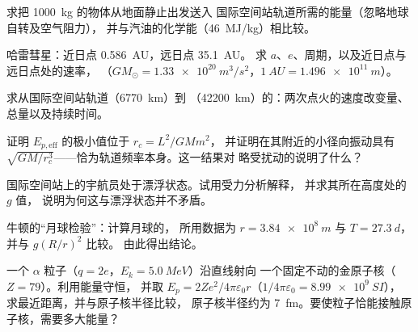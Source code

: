 \begin{exercise}[$\star\star$]\label{exo:b1:central-forces:5}
求把 \qty{1000}{kg} 的物体从地面静止出发送入
国际空间站轨道所需的能量（忽略地球自转及空气阻力），
并与汽油的化学能（\qty{46}{MJ/kg}）相比较。
\end{exercise}

\begin{exercise}[$\star\star$]\label{exo:b1:central-forces:6}
哈雷彗星：近日点 \qty{0.586}{AU}，远日点 \qty{35.1}{AU}。
求 $a$、$e$、周期，以及近日点与远日点处的速率，
（$GM_\odot = \qty{1.33e20}{m^3/s^2}$，$\qty{1}{AU} = \qty{1.496e11}{m}$）。
\end{exercise}

\begin{exercise}[$\star\star$]\label{exo:b1:central-forces:7}
求从国际空间站轨道（\qty{6770}{km}）到
（\qty{42200}{km}）的：两次点火的速度改变量、总量以及持续时间。
\end{exercise}

\begin{exercise}[$\star\star$]\label{exo:b1:central-forces:8}
证明 $E_{p,\mathrm{eff}}$ 的极小值位于 $r_c = L^2/GMm^2$，
并证明在其附近的小径向振动具有
$\sqrt{GM/r_c^3}$——恰为轨道频率本身。这一结果对
略受扰动的说明了什么？
\end{exercise}

\begin{exercise}[$\star\star$]\label{exo:b1:central-forces:9}
国际空间站上的宇航员处于漂浮状态。试用受力分析解释，
并求其所在高度处的 $g$ 值，
说明为何这与漂浮状态并不矛盾。
\end{exercise}

\begin{exercise}[$\star\star\star$]\label{exo:b1:central-forces:10}
牛顿的“月球检验”：计算月球的，
所用数据为 $r = \qty{3.84e8}{m}$ 与 $T = \qty{27.3}{d}$，并与 $g(R/r)^2$ 比较。
由此得出结论。
\end{exercise}

\begin{exercise}[$\star\star\star$]\label{exo:b1:central-forces:11}
一个 $\alpha$ 粒子（$q = 2e$，$E_k = \qty{5.0}{MeV}$）沿直线射向
一个固定不动的金原子核（$Z = 79$）。利用能量守恒，
并取 $E_p = 2Ze^2/4\pi\varepsilon_0r$（$1/4\pi\varepsilon_0 = \qty{8.99e9}{SI}$），
求最近距离，并与原子核半径比较，
原子核半径约为 \qty{7}{fm}。要使粒子恰能接触原子核，需要多大能量？
\end{exercise}


